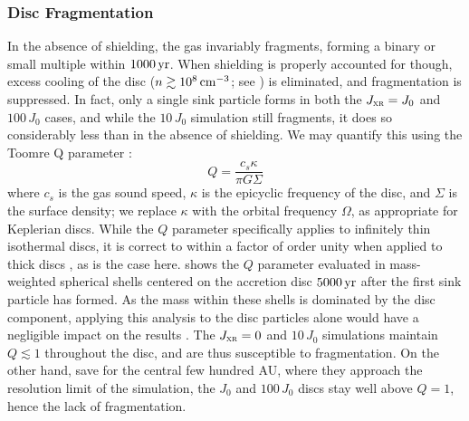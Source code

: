 \documentclass[../thesis.tex]{subfiles}
\begin{document}
\subsubsection{Disc Fragmentation}
\label{fragmentation}
In the absence of shielding, the gas invariably fragments, forming a binary or small multiple within $1000\,\mathrm{yr}$.  When shielding is properly accounted for though, excess cooling of the disc ($n\gtrsim10^8\,\mathrm{cm}^{-3}$; see ) is eliminated, and fragmentation is suppressed.  In fact, only a single sink particle forms in both the $J_{\textsc{xr}}=J_0$ and $100\,J_0$ cases, and while the $10\,J_0$ simulation still fragments, it does so considerably less than in the absence of shielding.  We may quantify this using the Toomre Q parameter \citep{Toomre1964}: 
\begin{equation}
Q = \frac{c_s \kappa}{\pi G \Sigma}
\end{equation}
where $c_s$ is the gas sound speed, $\kappa$ is the epicyclic frequency of the disc, and $\Sigma$ is the surface density; we replace $\kappa$ with the orbital frequency $\Omega$, as appropriate for Keplerian discs.  While the $Q$ parameter specifically applies to infinitely thin isothermal discs, it is correct to within a factor of order unity when applied to thick discs \citep{Wangetal2010}, as is the case here.  shows the $Q$ parameter evaluated in mass-weighted spherical shells centered on the accretion disc $5000\,\mathrm{yr}$ after the first sink particle has formed.  As the mass within these shells is dominated by the disc component, applying this analysis to the disc particles alone would have a negligible impact on the results \citep[e.g.,][]{Greifetal2012}.  The $J_{\textsc{xr}}=0$ and $10\,J_0$ simulations maintain $Q\lesssim1$ throughout the disc, and are thus susceptible to fragmentation.  On the other hand, save for the central few hundred AU, where they approach the resolution limit of the simulation, the $J_0$ and $100\,J_0$ discs stay well above $Q=1$, hence the lack of fragmentation.
\end{document}
